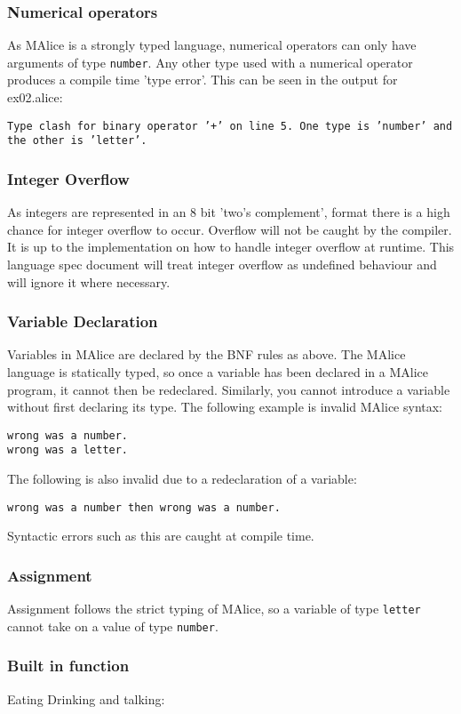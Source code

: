 \documentclass[a4wide, 10pt]{article}
\newcommand{\tab}{\hspace*{2em}}
\begin{document}
\subsubsection{Numerical operators}
As MAlice is a strongly typed language, numerical operators can only have 
arguments of type \texttt{number}. Any other type used with a numerical operator
produces a compile time 'type error'. This can be seen in the output for 
ex02.alice:

\texttt{Type clash for binary operator '+' on line 5. One type is 'number' and 
the other is 'letter'.}

\subsubsection{Integer Overflow}
As integers are represented in an 8 bit 'two's complement', format there is 
a high chance for integer overflow to occur. Overflow will not be caught
by the compiler. It is up to the implementation on how to handle integer 
overflow at runtime. This language spec document will treat integer 
overflow as undefined behaviour and will ignore it where necessary.

\subsubsection{Variable Declaration}
Variables in MAlice are declared by the BNF rules as above. The MAlice 
language is statically typed, so once a variable has been declared in a
MAlice program, it cannot then be redeclared. Similarly, you cannot introduce
a variable without first declaring its type. The following example is
invalid MAlice syntax:

\texttt{\tab wrong was a number.\\ \tab wrong was a letter.}

The following is also invalid due to a redeclaration of a variable:

\texttt{\tab wrong was a number then wrong was a number.} 

Syntactic errors such as this are caught at compile time.

\subsubsection{Assignment}
Assignment follows the strict typing of MAlice, so a variable of type 
\texttt{letter} cannot take on a value of type \texttt{number}.

\subsubsection{Built in function}
Eating Drinking and talking: 

\end{document}
